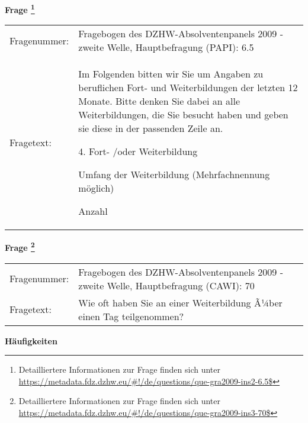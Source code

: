 				\vspace*{0.5cm}
                \noindent\textbf{Frage
	                \footnote{Detailliertere Informationen zur Frage finden sich unter
		              \url{https://metadata.fdz.dzhw.eu/\#!/de/questions/que-gra2009-ins2-6.5$}}}\\
				\begin{tabularx}{\hsize}{@{}lX}
					Fragenummer: &
					  Fragebogen des DZHW-Absolventenpanels 2009 - zweite Welle, Hauptbefragung (PAPI):
					  6.5
 \\
					Fragetext: & Im Folgenden bitten wir Sie um Angaben zu beruflichen Fort- und Weiterbildungen der letzten 12 Monate. Bitte denken Sie dabei an alle Weiterbildungen, die Sie besucht haben und geben sie diese in der passenden Zeile an.\par  4. Fort- /oder Weiterbildung\par  Umfang der Weiterbildung (Mehrfachnennung möglich)\par  Anzahl \\
				\end{tabularx}
				\vspace*{0.5cm}
                \noindent\textbf{Frage
	                \footnote{Detailliertere Informationen zur Frage finden sich unter
		              \url{https://metadata.fdz.dzhw.eu/\#!/de/questions/que-gra2009-ins3-70$}}}\\
				\begin{tabularx}{\hsize}{@{}lX}
					Fragenummer: &
					  Fragebogen des DZHW-Absolventenpanels 2009 - zweite Welle, Hauptbefragung (CAWI):
					  70
 \\
					Fragetext: & Wie oft haben Sie an einer Weiterbildung Ã¼ber einen Tag teilgenommen? \\
				\end{tabularx}





        		\vspace*{0.5cm}
                \noindent\textbf{Häufigkeiten}

